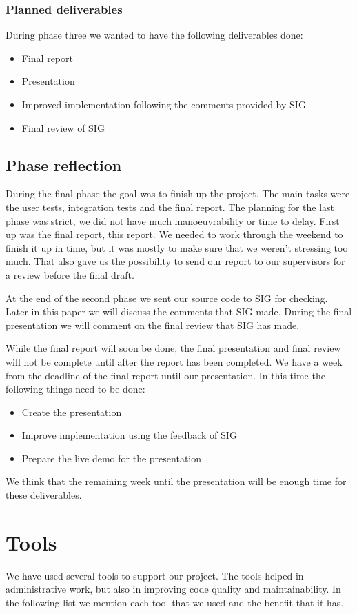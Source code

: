 \subsubsection{Planned deliverables}
During phase three we wanted to have the following deliverables done:
\begin{itemize}
\item Final report
\item Presentation
\item Improved implementation following the comments provided by SIG
\item Final review of SIG
\end{itemize}

\subsection{Phase reflection}
During the final phase the goal was to finish up the project.
The main tasks were the user tests, integration tests and the final report.
The planning for the last phase was strict, we did not have much manoeuvrability or time to delay.
First up was the final report, this report.
We needed to work through the weekend to finish it up in time, but it was mostly to make sure that we weren't stressing too much.
That also gave us the possibility to send our report to our supervisors for a review before the final draft.

At the end of the second phase we sent our source code to SIG for checking.
Later in this paper we will discuss the comments that SIG made.
During the final presentation we will comment on the final review that SIG has made.

While the final report will soon be done, the final presentation and final review will not be complete until after the report has been completed.
We have a week from the deadline of the final report until our presentation.
In this time the following things need to be done:
\begin{itemize}
\item Create the presentation
\item Improve implementation using the feedback of SIG
\item Prepare the live demo for the presentation
\end{itemize}
We think that the remaining week until the presentation will be enough time for these deliverables.

\section{Tools}
We have used several tools to support our project.
The tools helped in administrative work, but also in improving code quality and maintainability.
In the following list we mention each tool that we used and the benefit that it has.

